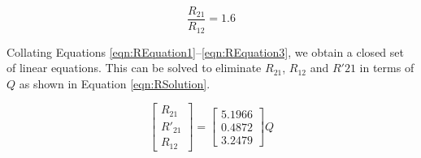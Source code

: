 \begin{equation}
  \frac{R_{21}}{R_{12}} = 1.6
  \label{eqn:REquation3}
\end{equation}

Collating Equations \ref{eqn:REquation1}--\ref{eqn:REquation3}, we obtain a closed set of linear equations.
This can be solved to eliminate \(R_{21}\), \(R_{12}\) and \(R'{21}\) in terms of \(Q\) as shown in Equation \ref{eqn:RSolution}.

\begin{equation}
  \left[
    \begin{matrix}
      R_{21}\\
      R'_{21}\\
      R_{12}
    \end{matrix}
  \right] = \left[
    \begin{matrix}
      5.1966\\
      0.4872\\
      3.2479
    \end{matrix}
  \right] Q
  \label{eqn:RSolution}
\end{equation}

